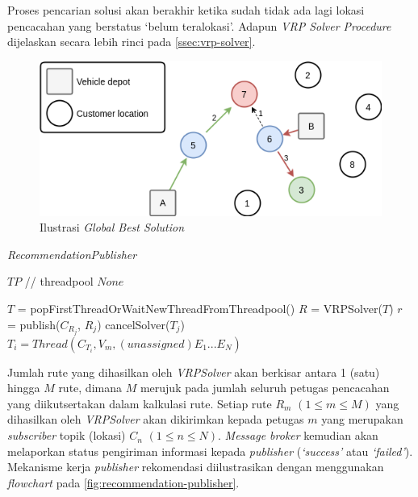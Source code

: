 Proses pencarian solusi akan berakhir ketika sudah tidak ada lagi lokasi pencacahan yang berstatus `belum teralokasi'. Adapun \textit{VRP Solver Procedure} dijelaskan secara lebih rinci pada \autoref{ssec:vrp-solver}.


\begin{figure}[!]
	\centering
	\includegraphics[width=12cm]{Resources/Images/global-best-greedy-solution}
	\captionsetup{format=hang}
	\caption{Ilustrasi \textit{Global Best Solution}}
	\label{fig:global-best-greedy-solution}
\end{figure}


\begin{algorithm}[!]
	\captionsetup{format=hang}
	\caption{\textit{RecommendationPublisher}}
	\label{alg:vrp-worker}
	\begin{algorithmic}[1]
		\renewcommand{\algorithmicrequire}{\textbf{Input:}}
		\renewcommand{\algorithmicensure}{\textbf{Output:}}
		\REQUIRE $TP$		// threadpool
		\ENSURE  $None$
		
		\STATE $T$ = popFirstThreadOrWaitNewThreadFromThreadpool()
		\STATE $R$ = VRPSolver($T$)
		\STATE $r$ = publish($C_{R_j}$, $R_j$)
		\STATE cancelSolver($T_j$)
		\STATE $T_i = Thread(C_{T_i}, V_m, (unassigned) E_1...E_N)$
		\ENDIF
		\ENDFOR
		\ENDWHILE	
	\end{algorithmic}
\end{algorithm}


Jumlah rute yang dihasilkan oleh \textit{VRPSolver} akan berkisar antara 1 (satu) hingga $M$ rute, dimana $M$ merujuk pada jumlah seluruh petugas pencacahan yang diikutsertakan dalam kalkulasi rute. Setiap rute $R_m$ $(1 \leq m \leq M)$ yang dihasilkan oleh \textit{VRPSolver} akan dikirimkan kepada petugas $m$ yang merupakan \textit{subscriber} topik (lokasi) $C_n$ $(1 \leq n \leq N)$. \textit{Message broker} kemudian akan melaporkan status pengiriman informasi kepada \textit{publisher} (\textit{`success'} atau \textit{`failed'}). Mekanisme kerja \textit{publisher} rekomendasi diilustrasikan dengan menggunakan \textit{flowchart} pada \autoref{fig:recommendation-publisher}.



